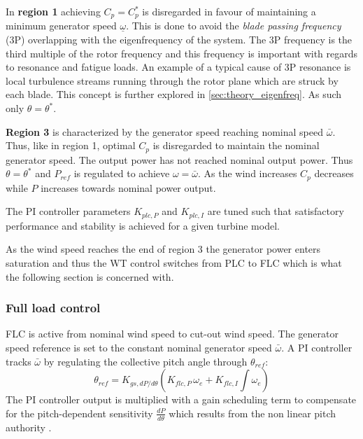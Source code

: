 In \textbf{region 1} achieving $ C_p = C_p^* $ is disregarded in favour of maintaining a minimum generator speed $ \underline{\omega} $. This is done to avoid the \textit{blade passing frequency} (3P) overlapping with the eigenfrequency of the system. The 3P frequency is the third multiple of the rotor frequency and this frequency is important with regards to resonance and fatigue loads. An example of a typical cause of 3P resonance is local turbulence streams running through the rotor plane which are struck by each blade. This concept is further explored in \cref{sec:theory_eigenfreq}. As such only $ \theta = \theta^* $.

\textbf{Region 3} is characterized by the generator speed reaching nominal speed $ \bar{\omega} $. Thus, like in region 1, optimal $ C_p $ is disregarded to maintain the nominal generator speed. The output power has not reached nominal output power. Thus $ \theta = \theta^* $ and $ P_{ref} $ is regulated to achieve $ \omega = \bar{\omega} $. As the wind increases $ C_p $ decreases while $ P $ increases towards nominal power output. 

The PI controller parameters $ K_{plc,P} $ and $ K_{plc,I} $ are tuned such that satisfactory performance and stability is achieved for a given turbine model. 

As the wind speed reaches the end of region 3 the generator power enters saturation and thus the WT control switches from PLC to FLC which is what the following section is concerned with.


\subsubsection{Full load control} \label{sec:theory_ctrl_flc}
FLC is active from nominal wind speed to cut-out wind speed. The generator speed reference is set to the constant nominal generator speed $ \bar{\omega} $. A PI controller tracks $ \bar{\omega} $ by regulating the collective pitch angle through $ \theta_{ref} $:
\begin{equation}\label{eq:pi_flc_ctrl}
	\theta_{ref} = K_{gs,dP/d\theta} \left(K_{flc,P} \, \omega_e + K_{flc,I} \int \omega_e\right)
\end{equation}
The PI controller output is multiplied with a gain scheduling term to compensate for the pitch-dependent sensitivity $ \frac{dP}{d\theta} $ which results from the non linear pitch authority \cite{Pao2009}. 

